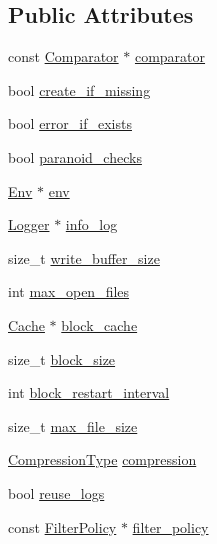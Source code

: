 \subsection*{Public Attributes}
\begin{DoxyCompactItemize}
\item 
const \mbox{\hyperlink{structleveldb_1_1_comparator}{Comparator}} $\ast$ \mbox{\hyperlink{structleveldb_1_1_options_a7522fbf79de73c4f73ef8d9392e8c80b}{comparator}}
\item 
bool \mbox{\hyperlink{structleveldb_1_1_options_afe1b4e94164ff8f081b1c25bf1bcb62e}{create\+\_\+if\+\_\+missing}}
\item 
bool \mbox{\hyperlink{structleveldb_1_1_options_aff3b99b1b30a2dba9642adc6c912d5b7}{error\+\_\+if\+\_\+exists}}
\item 
bool \mbox{\hyperlink{structleveldb_1_1_options_a4263dcc655493100eecc9daf6737a10b}{paranoid\+\_\+checks}}
\item 
\mbox{\hyperlink{classleveldb_1_1_env}{Env}} $\ast$ \mbox{\hyperlink{structleveldb_1_1_options_aeb08bfe820e9c89f57446d6fbd2e6ea8}{env}}
\item 
\mbox{\hyperlink{classleveldb_1_1_logger}{Logger}} $\ast$ \mbox{\hyperlink{structleveldb_1_1_options_af5545cba00b0e9763ad0279a74acc429}{info\+\_\+log}}
\item 
size\+\_\+t \mbox{\hyperlink{structleveldb_1_1_options_a017f1f9558e6b3887434df29a16dac97}{write\+\_\+buffer\+\_\+size}}
\item 
int \mbox{\hyperlink{structleveldb_1_1_options_a25c6ea125fc63342d8fc25b2f7817be4}{max\+\_\+open\+\_\+files}}
\item 
\mbox{\hyperlink{classleveldb_1_1_cache}{Cache}} $\ast$ \mbox{\hyperlink{structleveldb_1_1_options_a4e87749ebac1ba28dff6bb63eb2059e5}{block\+\_\+cache}}
\item 
size\+\_\+t \mbox{\hyperlink{structleveldb_1_1_options_a715c7941b43db641e76e598aa9ab52a0}{block\+\_\+size}}
\item 
int \mbox{\hyperlink{structleveldb_1_1_options_ac71d66ae44e481edc3922d3a139c30b4}{block\+\_\+restart\+\_\+interval}}
\item 
size\+\_\+t \mbox{\hyperlink{structleveldb_1_1_options_a3a12f43d8536d284460511e86cd56fc5}{max\+\_\+file\+\_\+size}}
\item 
\mbox{\hyperlink{namespaceleveldb_a047a8e77a76becb82bab4720994f6f9b}{Compression\+Type}} \mbox{\hyperlink{structleveldb_1_1_options_abdaf09c8bb3a788636ffb86cb93b01ab}{compression}}
\item 
bool \mbox{\hyperlink{structleveldb_1_1_options_aa264d17f9527539b18396a760424dcbc}{reuse\+\_\+logs}}
\item 
const \mbox{\hyperlink{classleveldb_1_1_filter_policy}{Filter\+Policy}} $\ast$ \mbox{\hyperlink{structleveldb_1_1_options_a24c88997a866d535e68de15b5c3cd02b}{filter\+\_\+policy}}
\end{DoxyCompactItemize}


